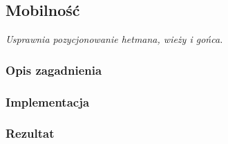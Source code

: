 \subsection{Mobilność}
\label{subsec:mobilnosc}
\textit{Usprawnia pozycjonowanie hetmana, wieży i gońca.}


\subsubsection{Opis zagadnienia}
\subsubsection{Implementacja}
\subsubsection{Rezultat}
